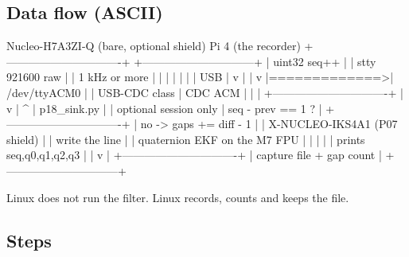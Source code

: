 \subsection*{Data flow (ASCII)}

\begin{asciiart}
  Nucleo-H7A3ZI-Q  (bare, optional shield)       Pi 4  (the recorder)
  +-------------------------------+              +------------------------------+
  | uint32 seq++                  |              | stty 921600 raw              |
  |   1 kHz or more               |              |   |                          |
  |   |                           |    USB       |   v                          |
  |   v                           |=============>| /dev/ttyACM0                 |
  | USB-CDC class                 |   CDC ACM    |   |                          |
  +-------------------------------+              |   v                          |
        ^                                        | p18_sink.py                  |
        |  optional session only                 |   seq - prev == 1 ?          |
  +-------------------------------+              |     no  -> gaps += diff - 1  |
  | X-NUCLEO-IKS4A1 (P07 shield)  |              |   write the line             |
  | quaternion EKF on the M7 FPU  |              |   |                          |
  | prints seq,q0,q1,q2,q3        |              |   v                          |
  +-------------------------------+              | capture file + gap count     |
                                                 +------------------------------+

  Linux does not run the filter.  Linux records, counts and keeps the file.
\end{asciiart}

\subsection*{Steps}

